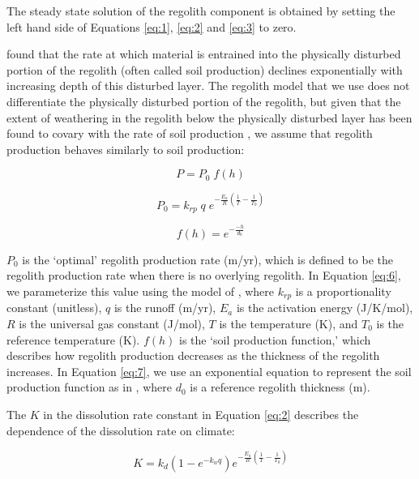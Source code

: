\documentclass[11pt,letterpaper]{article}
\begin{document}
The steady state solution of the regolith component is obtained by setting the left hand side of Equations \ref{eq:1}, \ref{eq:2} and \ref{eq:3} to zero.

\citet{Heimsath1997a} found that the rate at which material is entrained into the physically disturbed portion of the regolith (often called soil production) declines exponentially with increasing depth of this disturbed layer. The regolith model that we use does not differentiate the physically disturbed portion of the regolith, but given that the extent of weathering in the regolith below the physically disturbed layer has been found to covary with the rate of soil production \citep{Burke2007a}, we assume that regolith production behaves similarly to soil production:

\begin{equation}
    P = P_{0}\;f(h)
    \label{eq:5}
\end{equation}

\begin{equation}
    P_{0} = k_{rp}\;q\;e^{-\frac{E_{a}}{R}\left(\frac{1}{T}-\frac{1}{T_{0}}\right)}
    \label{eq:6}
\end{equation}

\begin{equation}
    f(h) = e^{-\frac{-h}{d_{0}}}
    \label{eq:7}
\end{equation}

\noindent
$P_{0}$ is the `optimal' regolith production rate (m/yr), which is defined to be the regolith production rate when there is no overlying regolith. In Equation \ref{eq:6}, we parameterize this value using the model of \citet{Carretier2014a}, where $k_{rp}$ is a proportionality constant (unitless), $q$ is the runoff (m/yr), $E_{a}$ is the activation energy (J/K/mol), $R$ is the universal gas constant (J/mol), $T$ is the temperature (K), and $T_{0}$ is the reference temperature (K). $f(h)$ is the `soil production function,' which describes how regolith production decreases as the thickness of the regolith increases. In Equation \ref{eq:7}, we use an exponential equation to represent the soil production function as in \citet{Heimsath1997a}, where $d_{0}$ is a reference regolith thickness (m).

The $K$ in the dissolution rate constant in Equation \ref{eq:2} describes the dependence of the dissolution rate on climate:

\begin{equation}
    K = k_{d}\left(1-e^{-k_{w}q}\right)e^{-\frac{E_{a}}{R}\left(\frac{1}{T}-\frac{1}{T_{0}}\right)}
    \label{eq:8}
\end{equation}
\end{document}
